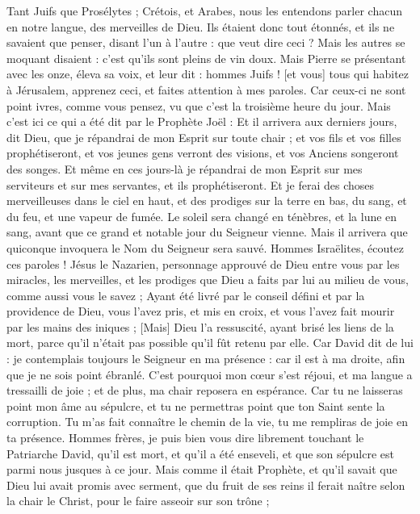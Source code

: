 \begin{multicols}{2}
Tant Juifs que Prosélytes ; Crétois, et Arabes, nous les entendons parler chacun en notre langue, des merveilles de Dieu.
Ils étaient donc tout étonnés, et ils ne savaient que penser, disant l'un à l'autre : que veut dire ceci ?
Mais les autres se moquant disaient : c'est qu'ils sont pleins de vin doux.
Mais Pierre se présentant avec les onze, éleva sa voix, et leur dit : hommes Juifs ! [et vous] tous qui habitez à Jérusalem, apprenez ceci, et faites attention à mes paroles.
Car ceux-ci ne sont point ivres, comme vous pensez, vu que c'est la troisième heure du jour.
Mais c'est ici ce qui a été dit par le Prophète Joël :
Et il arrivera aux derniers jours, dit Dieu, que je répandrai de mon Esprit sur toute chair ; et vos fils et vos filles prophétiseront, et vos jeunes gens verront des visions, et vos Anciens songeront des songes.
Et même en ces jours-là je répandrai de mon Esprit sur mes serviteurs et sur mes servantes, et ils prophétiseront.
Et je ferai des choses merveilleuses dans le ciel en haut, et des prodiges sur la terre en bas, du sang, et du feu, et une vapeur de fumée.
Le soleil sera changé en ténèbres, et la lune en sang, avant que ce grand et notable jour du Seigneur vienne.
Mais il arrivera que quiconque invoquera le Nom du Seigneur sera sauvé.
Hommes Israëlites, écoutez ces paroles ! Jésus le Nazarien, personnage approuvé de Dieu entre vous par les miracles, les merveilles, et les prodiges que Dieu a faits par lui au milieu de vous, comme aussi vous le savez ;
Ayant été livré par le conseil défini et par la providence de Dieu, vous l'avez pris, et mis en croix, et vous l'avez fait mourir par les mains des iniques ;
[Mais] Dieu l'a ressuscité, ayant brisé les liens de la mort, parce qu'il n'était pas possible qu'il fût retenu par elle.
Car David dit de lui : je contemplais toujours le Seigneur en ma présence : car il est à ma droite, afin que je ne sois point ébranlé.
C'est pourquoi mon cœur s'est réjoui, et ma langue a tressailli de joie ; et de plus, ma chair reposera en espérance.
Car tu ne laisseras point mon âme au sépulcre, et tu ne permettras point que ton Saint sente la corruption.
Tu m'as fait connaître le chemin de la vie, tu me rempliras de joie en ta présence.
Hommes frères, je puis bien vous dire librement touchant le Patriarche David, qu'il est mort, et qu'il a été enseveli, et que son sépulcre est parmi nous jusques à ce jour.
Mais comme il était Prophète, et qu'il savait que Dieu lui avait promis avec serment, que du fruit de ses reins il ferait naître selon la chair le Christ, pour le faire asseoir sur son trône ;

\end{multicols}
